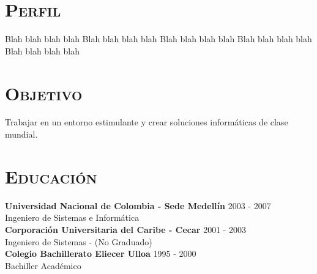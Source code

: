 \begin{resume}



\section{\textsc{Perfil}}
Blah blah blah blah Blah blah blah blah Blah blah blah blah Blah blah blah blah Blah blah blah blah

\section{\textsc{Objetivo}}
Trabajar en un entorno estimulante y crear soluciones
inform\'{a}ticas de clase mundial.



\section{\textsc{Educaci\'{o}n}}
\textbf{Universidad Nacional de Colombia  - Sede  Medell\'{i}n} \hfill 2003 - 2007 \\
{Ingeniero de Sistemas e Inform\'{a}tica } \hfill\\

\textbf{Corporaci\'{o}n Universitaria del Caribe  - Cecar} \hfill  2001 - 2003  \\
{Ingeniero de Sistemas - (No Graduado) } \hfill \\

\textbf{Colegio Bachillerato Eliecer Ulloa} \hfill  1995 - 2000  \\
{Bachiller Acad\'{e}mico} \hfill
\newline



\end{resume}
